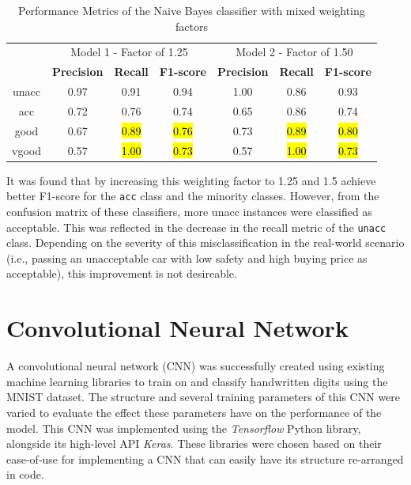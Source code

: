\documentclass[a4paper]{article}
\begin{document}
\begin{table}[ht]
  \centering
  \caption{Performance Metrics of the Naive Bayes classifier with mixed weighting factors}
  \label{tab:nb_performance_1.25_5_5}
  \begin{tabular}{||c | c c c | c c c||}

  \hline
  \centering
  \multirow{2}{*}{Class}    & \multicolumn{3}{c|}{Model 1 - Factor of 1.25}                     & \multicolumn{3}{c||}{Model 2 - Factor of 1.50} \\\cline{2-7} 
                            & \textbf{Precision}  & \textbf{Recall}   & \textbf{F1-score}       & \textbf{Precision}  & \textbf{Recall}   & \textbf{F1-score}\\
  \hline \hline
  unacc                     & 0.97                & 0.91              & 0.94                    & 1.00                & 0.86              & 0.93\\ \hline
  acc                       & 0.72                & 0.76              & 0.74                    & 0.65                & 0.86              & 0.74\\ \hline
  good                      & 0.67                & \hl{0.89}         & \hl{0.76}               & 0.73                & \hl{0.89}         & \hl{0.80}\\ \hline
  vgood                     & 0.57                & \hl{1.00}         & \hl{0.73}               & 0.57                & \hl{1.00}         & \hl{0.73}\\ \hline
  \end{tabular}
\end{table}


It was found that by increasing this weighting factor to 1.25 and 1.5 achieve better F1-score for the \lstinline{acc} class and the minority classes. However, from the confusion matrix of these classifiers, more unacc instances were classified as acceptable. This was reflected in the decrease in the recall metric of the \lstinline{unacc} class. Depending on the severity of this misclassification in the real-world scenario (i.e., passing an unacceptable car with low safety and high buying price as acceptable), this improvement is not desireable.

\section{Convolutional Neural Network}
A convolutional neural network (CNN) was successfully created using existing machine learning libraries to train on and classify handwritten digits using the MNIST dataset. The structure and several training parameters of this CNN were varied to evaluate the effect these parameters have on the performance of the model. This CNN was implemented using the \textit{Tensorflow} Python library, alongside its high-level API \textit{Keras}. These libraries were chosen based on their ease-of-use for implementing a CNN that can easily have its structure re-arranged in code. 
\end{document}
